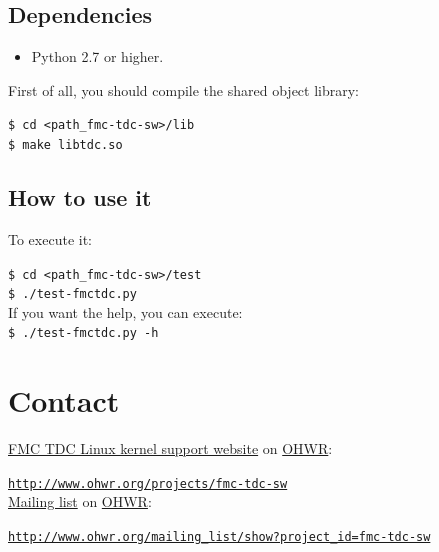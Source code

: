 \documentclass[a4paper,11pt]{article}
\begin{document}
\subsection{Dependencies}
\begin{itemize}
  \item Python 2.7 or higher.
\end{itemize}
First of all, you should compile the shared object library:

\indent\indent\texttt{\$ cd <path\_fmc-tdc-sw>/lib} \\
\indent\indent\texttt{\$ make libtdc.so}

\subsection{How to use it}

To execute it:

\indent\indent\texttt{\$ cd <path\_fmc-tdc-sw>/test} \\
\indent\indent\texttt{\$ ./test-fmctdc.py} \\
If you want the help, you can execute:\\
\indent\indent\texttt{\$ ./test-fmctdc.py -h} \\

\section{Contact}
\href{http://www.ohwr.org/projects/fmc-tdc-sw}{FMC TDC Linux kernel support website} on \href{http://www.ohwr.org/}{OHWR}:

\indent\indent\texttt{\url{http://www.ohwr.org/projects/fmc-tdc-sw}}\\
\href{http://www.ohwr.org/mailing_list/show?project_id=fmc-tdc-sw}{Mailing list} on \href{http://www.ohwr.org/}{OHWR}:

\indent\indent\texttt{\url{http://www.ohwr.org/mailing_list/show?project_id=fmc-tdc-sw}}
\end{document}
